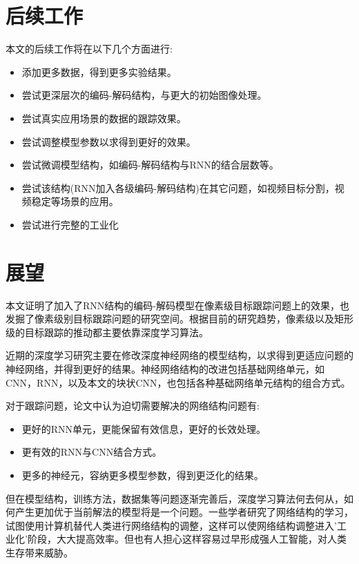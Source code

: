 \section{后续工作}
本文的后续工作将在以下几个方面进行:
\begin{itemize}
    \item 添加更多数据，得到更多实验结果。
    \item 尝试更深层次的编码-解码结构，与更大的初始图像处理。
    \item 尝试真实应用场景的数据的跟踪效果。
    \item 尝试调整模型参数以求得到更好的效果。
    \item 尝试微调模型结构，如编码-解码结构与RNN的结合层数等。
    \item 尝试该结构(RNN加入各级编码-解码结构)在其它问题，如视频目标分割，视频稳定等场景的应用。
    \item 尝试进行完整的工业化
\end{itemize}

\section{展望}
本文证明了加入了RNN结构的编码-解码模型在像素级目标跟踪问题上的效果，也发掘了像素级别目标跟踪问题的研究空间。根据目前的研究趋势，像素级以及矩形级的目标跟踪的推动都主要依靠深度学习算法。
\par
近期的深度学习研究主要在修改深度神经网络的模型结构，以求得到更适应问题的神经网络，并得到更好的结果。神经网络结构的改进包括基础网络单元，如CNN，RNN，以及本文的块状CNN，也包括各种基础网络单元结构的组合方式。
\par
对于跟踪问题，论文中认为迫切需要解决的网络结构问题有:
\begin{itemize}
    \item 更好的RNN单元，更能保留有效信息，更好的长效处理。
    \item 更有效的RNN与CNN结合方式。
    \item 更多的神经元，容纳更多模型参数，得到更泛化的结果。
\end{itemize}
\par
但在模型结构，训练方法，数据集等问题逐渐完善后，深度学习算法何去何从，如何产生更加优于当前解法的模型将是一个问题。一些学者研究了网络结构的学习\supercite{cortes2017adanet}，试图使用计算机替代人类进行网络结构的调整，这样可以使网络结构调整进入'工业化'阶段，大大提高效率。但也有人担心这样容易过早形成强人工智能\supercite{kurzweil2005singularity}，对人类生存带来威胁。

